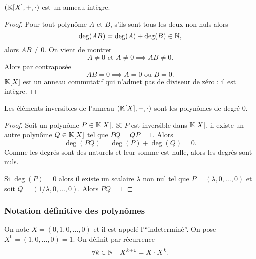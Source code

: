 \begin{cor}
  \((\mathbb{K}[X],+,\cdot)\) est un anneau intègre.
\end{cor}
\begin{proof}
  Pour tout polynôme \(A\) et \(B\), s'ils sont tous les deux non nuls alors
  \begin{equation}
    \deg(AB) = \deg(A)+\deg(B) \in \mathbb{N},
  \end{equation}
  alors \(AB \neq 0\). On vient de montrer
  \begin{equation}
    A\neq 0 \text{~et~} A \neq 0 \implies AB \neq 0.
  \end{equation}
  Alors par contraposée
  \begin{equation}
    AB = 0 \implies A=0 \text{~ou~} B=0.
  \end{equation}
  \(\mathbb{K}[X]\) est un anneau commutatif qui n'admet pas de diviseur de zéro : il 
  est intègre.
\end{proof}

\begin{prop}
  Les éléments inversibles de l'anneau \((\mathbb{K}[X],+,\cdot)\) sont les polynômes de 
  degré \(0\).
\end{prop}
\begin{proof}
  Soit un polynôme \(P \in \mathbb{K}[X]\). Si \(P\) est inversible dans \(\mathbb{K}[X]\), il 
  existe un autre polynôme \(Q \in \mathbb{K}[X]\) tel que \(PQ=QP=1\). Alors
  \begin{equation}
    \deg(PQ)=\deg(P)+\deg(Q)=0.
  \end{equation}
  Comme les degrés sont des naturels et leur somme est nulle, alors les degrés 
  sont nuls.

  Si \(\deg(P)=0\) alors il existe un scalaire \(\lambda\) non nul tel que 
  \(P=(\lambda,0, \ldots, 0)\) et soit \(Q=(1/\lambda, 0, \ldots, 0)\). Alors 
  \(PQ=1\)
\end{proof}

\subsubsection{Notation définitive des polynômes}

On note \(X = (0,1,0, \ldots, 0)\) et il est appelé l'``indeterminé''. On pose 
\(X^0=(1,0, \ldots,0)=1\). On définit par récurrence
\begin{equation}
  \forall k \in \mathbb{N} \quad X^{k+1}=X \cdot X^k.
\end{equation}

